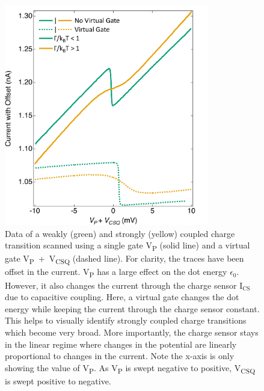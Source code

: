 \begin{figure}[!htb]
 \begin{center}
 \includegraphics[width=0.8\textwidth]{figures/ch1/figure8.pdf}
 \caption[Effects of a Virtual Gate]{\label{fig:ch1/virtual_gate_example} 
 Data of a weakly (green) and strongly (yellow) coupled charge transition scanned using a single gate V\textsubscript{P} (solid line) and a virtual gate V\textsubscript{P}~+~V\textsubscript{CSQ} (dashed line). For clarity, the traces have been offset in the current. V\textsubscript{P} has a large effect on the dot energy $\epsilon_0$. However, it also changes the current through the charge sensor $\mathrm{I_{CS}}$ due to capacitive coupling. Here, a virtual gate changes the dot energy while keeping the current through the charge sensor constant. This helps to visually identify strongly coupled charge transitions which become very broad. More importantly, the charge sensor stays in the linear regime where changes in the potential are linearly proportional to changes in the current. Note the x-axis is only showing the value of V\textsubscript{P}. As V\textsubscript{P} is swept negative to positive, V\textsubscript{CSQ} is swept positive to negative.}
 \end{center}
\end{figure}


